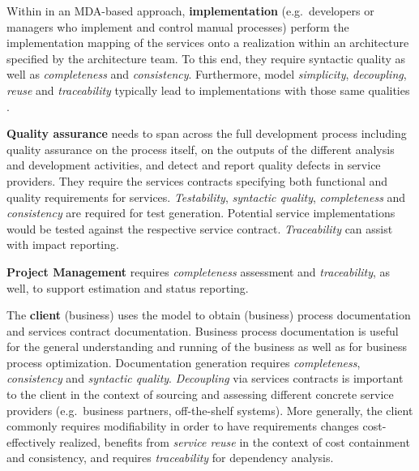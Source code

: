 Within in an MDA-based approach, {\bf implementation} (e.g.\ developers or managers who implement and control manual processes) perform the implementation mapping of the services onto a realization within an architecture specified by the architecture team. To this end, they require syntactic quality as well as \emph{completeness} and \emph{consistency}. Furthermore, model \emph{simplicity}, \emph{decoupling}, \emph{reuse} and \emph{traceability} typically lead to implementations with those same qualities \cite{podgorelec_estimating_2007}.

{\bf Quality assurance} needs to span across the full development process including quality assurance on the process itself, on the outputs of the different analysis and development activities, and detect and report quality defects in service providers. They require the services contracts specifying both functional and quality requirements for services. \emph{Testability}, \emph{syntactic quality}, \emph{completeness} and \emph{consistency} are required for test generation. Potential service implementations would be tested against the respective service contract. \emph{Traceability} can assist with impact reporting.

{\bf Project Management} requires \emph{completeness} assessment and \emph{traceability}, as well, to support estimation and status reporting.

The {\bf client} (business) uses the model to obtain (business) process documentation and services contract documentation. Business process documentation is useful for the general understanding and running of the business as well as for business process optimization. Documentation generation requires \emph{completeness}, \emph{consistency} and \emph{syntactic quality}. \emph{Decoupling} via services contracts is important to the client in the context of sourcing and assessing different concrete service providers (e.g.\ business partners, off-the-shelf systems). More generally, the client commonly requires modifiability in order to have requirements changes cost-effectively realized, benefits from \emph{service reuse} in the context of cost containment and consistency, and requires \emph{traceability} for dependency analysis.


